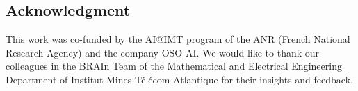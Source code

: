 \documentclass{article}
\begin{document}
\begin{sloppy}
\section{Acknowledgment}
This work was co-funded by the AI@IMT program of the ANR (French National Research Agency) and the company OSO-AI. We would like to thank our colleagues in the BRAIn Team of the Mathematical and Electrical Engineering Department of Institut Mines-Télécom Atlantique for their insights and feedback.






\end{sloppy}
\end{document}
